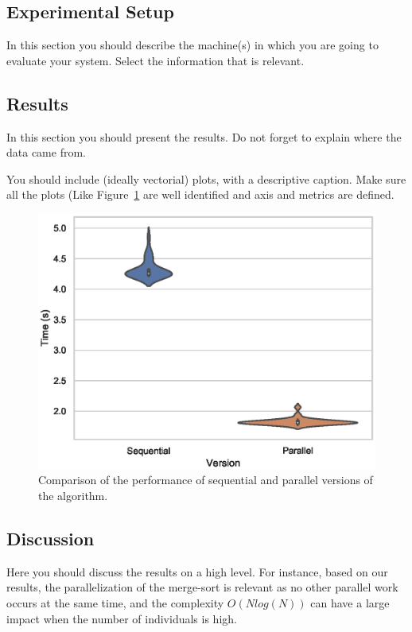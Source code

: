 \documentclass[runningheads]{llncs}
\begin{document}
\subsection{Experimental Setup}

In this section you should describe the machine(s) in which you are going to evaluate your system. Select the information that is relevant.


\subsection{Results}

In this section you should present the results. Do not forget to explain where the data came from. 

You should include (ideally vectorial) plots, with a descriptive caption. Make sure all the plots (Like Figure~\ref{fig1} are well identified and axis and metrics are defined.

\begin{figure}[htbp]
\includegraphics[width=\textwidth]{code/performance.eps}
\caption{Comparison of the performance of sequential and parallel versions of the algorithm.} \label{fig1}
\end{figure}


\subsection{Discussion}

Here you should discuss the results on a high level. For instance, based on our results, the parallelization of the merge-sort is relevant as no other parallel work occurs at the same time, and the complexity $O(N log(N))$ can have a large impact when the number of individuals is high.
\end{document}

